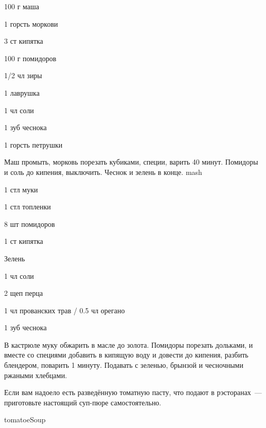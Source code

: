 {
\item 100 г маша
\item 1 горсть моркови
\item 3 ст кипятка
\item 100 г помидоров
}{
\item 1/2 чл зиры
\item 1 лаврушка
\item 1 чл соли
\item 1 зуб чеснока
\item 1 горсть петрушки
}{
Маш промыть, морковь порезать кубиками, специи, варить 40 минут. Помидоры и соль до кипения, выключить. Чеснок и зелень в конце.
}{}{mash}




{
\item 1 стл муки 
\item 1 стл топленки
\item 8 шт помидоров
\item 1 ст кипятка
\item Зелень 
}{
\item 1 чл соли
\item 2 щеп перца
\item 1 чл прованских трав / 0.5 чл орегано
\item 1 зуб чеснока
}{
В кастрюле муку обжарить в масле до золота. Помидоры порезать дольками, и вместе со специями добавить в кипящую воду и довести до кипения, разбить блендером, поварить 1 минуту. Подавать с зеленью, брынзой и чесночными ржаными хлебцами.
}{
\begin{advice}
\item Если вам надоело есть разведённую томатную пасту, что подают в рэсторанах~--- приготовьте настоящий суп-пюре самостоятельно.
\end{advice}}{tomatoeSoup}



